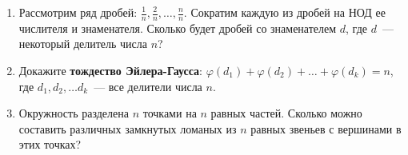 \documentclass{article}
\begin{document}
\begin{enumerate}[label*=\protect\fbox{\arabic{enumi}}]
\item Рассмотрим ряд дробей: $\frac{1}{n}, \frac{2}{n}, \ldots, \frac{n}{n}$. Сократим каждую из дробей на НОД ее числителя и знаменателя. Сколько будет дробей со знаменателем $d$, где $d$~--- некоторый делитель числа $n$?

\item Докажите \textbf{тождество Эйлера-Гаусса}: $\varphi(d_1) + \varphi(d_2) + \ldots + \varphi(d_k) = n$, где $d_1, d_2, \ldots d_k$~--- все делители числа $n$.

\item Окружность разделена $n$ точками на $n$ равных частей. Сколько можно составить различных замкнутых ломаных из $n$ равных звеньев с вершинами в этих точках?

\end{enumerate}
\end{document}
